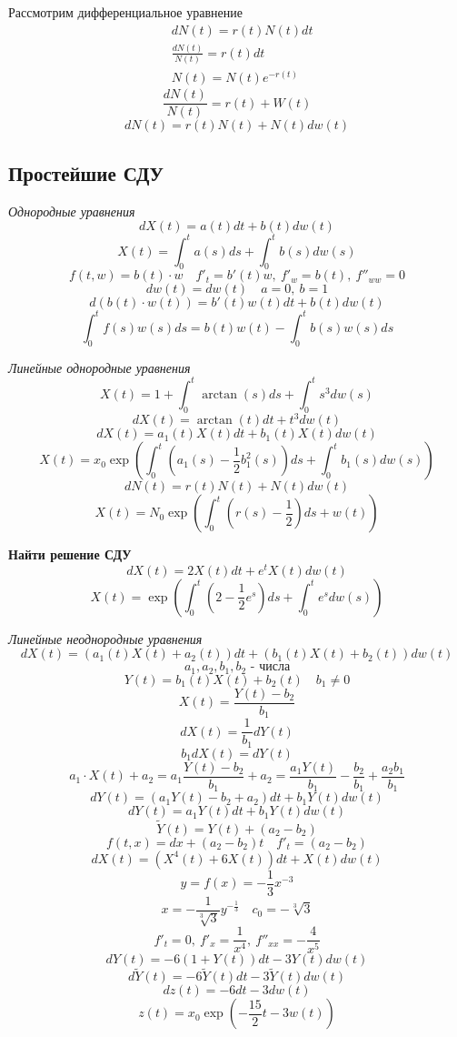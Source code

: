 \documentclass[a4paper]{article}
\theoremstyle{definition}
\theoremstyle{remark}
\begin{document}
Рассмотрим дифференциальное уравнение
\begin{equation}
    \begin{aligned}
        &dN(t) = r(t) N(t) dt\\
        &\frac{d N(t)}{N(t)} = r(t) dt\\
        &N(t) = N(t) e^{-r(t)}
    \end{aligned}
\end{equation}
\[
    \frac{dN(t)}{N(t)} = r(t) + W(t)
\]
\[
    dN(t) = r(t)N(t) + N(t)dw(t)
\]
\subsection*{Простейшие СДУ}
\emph{Однородные уравнения}
\begin{equation}
    dX(t) = a(t)dt + b(t) dw(t)
\end{equation}
\[
    X(t) = \int_{0}^{t} a(s)ds + \int_{0}^{t} b(s) dw(s)
\]
\[
    f(t,w) = b(t) \cdot w \quad f'_t = b'(t)w, \ f'_w = b(t), \ f''_{ww} = 0
\]
\[
    dw(t) = dw(t) \quad a = 0, \ b = 1
\]
\[
    d(b(t) \cdot w(t)) = b'(t)w(t)dt + b(t)dw(t)
\]
\[
    \int_{0}^{t} f(s) w(s) ds = b(t) w(t) - \int_{0}^{t} b(s) w(s) ds
\]

\emph{Линейные однородные уравнения}
\[
    X(t) = 1 + \int_{0}^{t} \arctan(s) ds + \int_{0}^{t} s^3 dw(s)
\]
\[
    dX(t) = \arctan(t) dt + t^3 dw(t)
\]
\begin{equation}
    dX(t) = a_1(t) X(t) dt + b_1(t)X(t) dw(t)
\end{equation}
\begin{equation}
    X(t) = x_0 \exp\left(\int_{0}^{t} \left(a_1(s) - \frac{1}{2} b^2_1(s)\right)ds +
    \int_{0}^{t} b_1(s) dw(s) \right)
\end{equation}
\[
    dN(t) = r(t) N(t) + N(t) dw(t)
\]
\[
    X(t) = N_0 \exp\left( \int_{0}^{t} \left( r(s) - \frac{1}{2} \right) ds + w(t) \right)
\]

\textbf{Найти решение СДУ}
\[
    dX(t) = 2X(t) dt + e^t X(t)dw(t)
\]
\[
    X(t) = \exp\left( \int_{0}^{t} \left(2 - \frac{1}{2} e^s \right) ds +
        \int_{0}^{t} e^s dw(s) \right)
\]

\emph{Линейные неоднородные уравнения}
\[
    dX(t) = (a_1(t) X(t) + a_2(t)) dt + (b_1(t)X(t) + b_2(t)) dw(t)
\]
\[
    a_1,a_2,b_1,b_2 \text{ - числа}
\]
\[
    Y(t) = b_1(t)X(t) + b_2(t) \quad b_1 \neq 0
\]
\[
    X(t) = \frac{Y(t) - b_2}{b_1} 
\]
\[
    dX(t) = \frac{1}{b_1} dY(t)
\]
\[
    b_1 dX(t) = dY(t)
\]
\[
    a_1 \cdot X(t) + a_2 = a_1 \frac{Y(t) - b_2}{b_1} + a_2 = \frac{a_1Y(t)}{b_1} 
    - \frac{b_2}{b_1} + \frac{a_2b_1}{b_1} 
\]
\[
    dY(t) = (a_1 Y(t) - b_2 + a_2)dt + b_1 Y(t) dw(t)
\]
\[
    dY(t) = a_1 Y(t) dt + b_1Y(t) dw(t)
\]
\[
    \widetilde{Y}(t) = Y(t) + (a_2 - b_2)
\]
\[
    f(t,x) = dx + (a_2 - b_2)t \quad f'_t = (a_2 - b_2)
\]
\[
    dX(t) = (X^4(t) + 6X(t))dt + X(t)dw(t)
\]
\[
    y = f(x) = -\frac{1}{3} x^{-3}
\]
\[
    x = -\frac{1}{\sqrt[3]{3}}y^{-\frac{1}{3}} \quad c_0 = -\sqrt[3]{3} 
\]
\[
    f'_t = 0, \ f'_x = \frac{1}{x^4}, \ f''_{x x} = -\frac{4}{x^5} 
\]
\[
    dY(t) = -6(1 + Y(t)) dt  - 3 Y(t) dw(t)
\]
\[
    d \widetilde{Y}(t) = -6 \widetilde{Y}(t) dt - 3 \widetilde{Y}(t) dw(t)
\]
\[
    dz(t) = -6dt - 3 dw(t)
\]
\[
    z(t) = x_0 \exp\left( -\frac{15}{2} t - 3 w(t)\right)
\]
\end{document}
